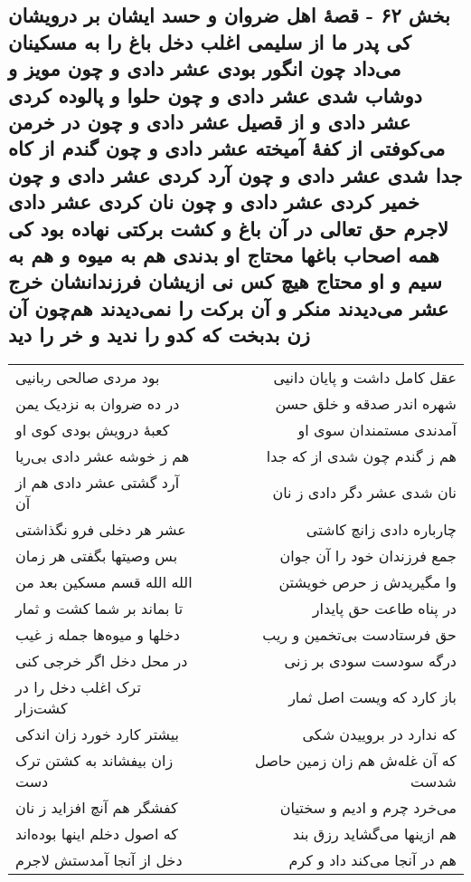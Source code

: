 \begin{center}
\section*{بخش ۶۲ - قصهٔ اهل ضروان و حسد ایشان بر درویشان کی پدر ما از سلیمی اغلب دخل باغ را به مسکینان می‌داد چون انگور بودی عشر دادی و چون مویز و دوشاب شدی عشر دادی و چون حلوا و پالوده کردی عشر دادی و از قصیل عشر دادی و چون در خرمن می‌کوفتی از کفهٔ آمیخته عشر دادی و چون گندم از کاه جدا شدی عشر دادی و چون آرد کردی عشر دادی و چون خمیر کردی عشر دادی و چون نان کردی عشر دادی لاجرم حق تعالی در آن باغ و کشت برکتی نهاده بود کی همه اصحاب باغها محتاج او بدندی هم به میوه و هم به سیم و او محتاج هیچ کس نی ازیشان فرزندانشان خرج عشر می‌دیدند منکر و آن برکت را نمی‌دیدند هم‌چون آن زن بدبخت که کدو را ندید و خر را دید}
\label{sec:sh062}
\begin{longtable}{l p{0.5cm} r}
بود مردی صالحی ربانیی
&&
عقل کامل داشت و پایان دانیی
\\
در ده ضروان به نزدیک یمن
&&
شهره اندر صدقه و خلق حسن
\\
کعبهٔ درویش بودی کوی او
&&
آمدندی مستمندان سوی او
\\
هم ز خوشه عشر دادی بی‌ریا
&&
هم ز گندم چون شدی از که جدا
\\
آرد گشتی عشر دادی هم از آن
&&
نان شدی عشر دگر دادی ز نان
\\
عشر هر دخلی فرو نگذاشتی
&&
چارباره دادی زانچ کاشتی
\\
بس وصیتها بگفتی هر زمان
&&
جمع فرزندان خود را آن جوان
\\
الله الله قسم مسکین بعد من
&&
وا مگیریدش ز حرص خویشتن
\\
تا بماند بر شما کشت و ثمار
&&
در پناه طاعت حق پایدار
\\
دخلها و میوه‌ها جمله ز غیب
&&
حق فرستادست بی‌تخمین و ریب
\\
در محل دخل اگر خرجی کنی
&&
درگه سودست سودی بر زنی
\\
ترک اغلب دخل را در کشت‌زار
&&
باز کارد که ویست اصل ثمار
\\
بیشتر کارد خورد زان اندکی
&&
که ندارد در بروییدن شکی
\\
زان بیفشاند به کشتن ترک دست
&&
که آن غله‌ش هم زان زمین حاصل شدست
\\
کفشگر هم آنچ افزاید ز نان
&&
می‌خرد چرم و ادیم و سختیان
\\
که اصول دخلم اینها بوده‌اند
&&
هم ازینها می‌گشاید رزق بند
\\
دخل از آنجا آمدستش لاجرم
&&
هم در آنجا می‌کند داد و کرم
\\

\end{longtable}
\end{center}
